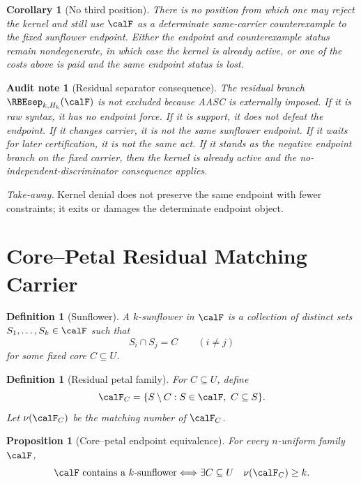 \documentclass[11pt]{article}
\newtheorem{proposition}[theorem]{Proposition}
\newtheorem{corollary}[theorem]{Corollary}
\newtheorem{definition}[theorem]{Definition}
\newtheorem{audit}[theorem]{Audit note}
\begin{document}
\begin{corollary}[No third position]\label{cor:no-third-kernel}
There is no position from which one may reject the kernel and still use \(\calF\) as a determinate same-carrier counterexample to the fixed sunflower endpoint.  Either the endpoint and counterexample status remain nondegenerate, in which case the kernel is already active, or one of the costs above is paid and the same endpoint status is lost.
\end{corollary}

\begin{audit}[Residual separator consequence]
The residual branch \(\RBEsep_{k,H_k}(\calF)\) is not excluded because AASC is externally imposed.  If it is raw syntax, it has no endpoint force.  If it is support, it does not defeat the endpoint.  If it changes carrier, it is not the same sunflower endpoint.  If it waits for later certification, it is not the same act.  If it stands as the negative endpoint branch on the fixed carrier, then the kernel is already active and the no-independent-discriminator consequence applies.
\end{audit}

\noindent\emph{Take-away.} Kernel denial does not preserve the same endpoint with fewer constraints; it exits or damages the determinate endpoint object.

\section{Core--Petal Residual Matching Carrier}

\begin{definition}[Sunflower]
A \(k\)-sunflower in \(\calF\) is a collection of distinct sets \(S_1,\dots,S_k\in\calF\) such that
\[
  S_i\cap S_j=C\qquad (i\ne j)
\]
for some fixed core \(C\subseteq U\).
\end{definition}

\begin{definition}[Residual petal family]
For \(C\subseteq U\), define
\[
  \calF_C=\{S\setminus C:S\in\calF,\ C\subseteq S\}.
\]
Let \(\nu(\calF_C)\) be the matching number of \(\calF_C\).
\end{definition}

\begin{proposition}[Core--petal endpoint equivalence]\label{prop:corepetal}
For every \(n\)-uniform family \(\calF\),
\[
  \calF\text{ contains a }k\text{-sunflower}
  \Longleftrightarrow
  \exists C\subseteq U\quad \nu(\calF_C)\ge k.
\]
\end{proposition}
\end{document}
